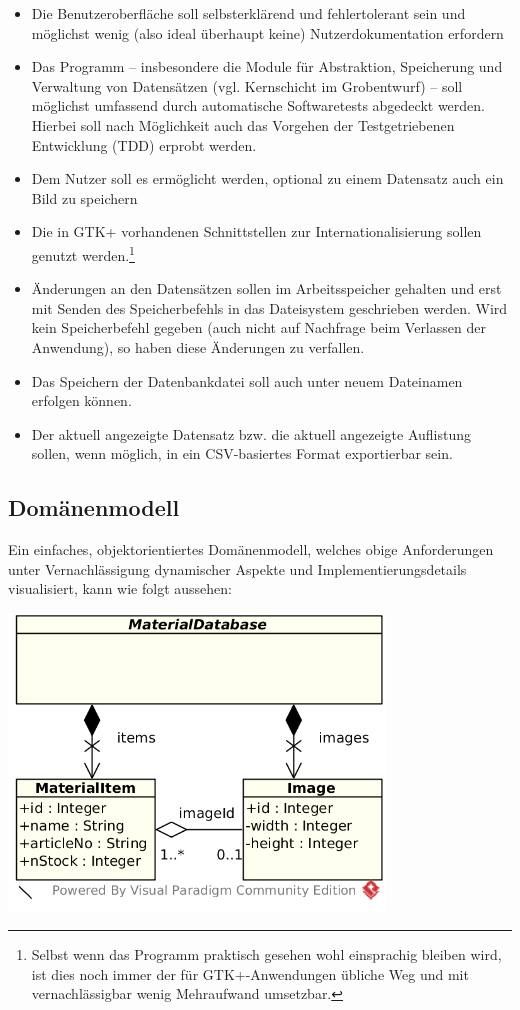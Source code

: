 \begin{itemize}
\item Die Benutzeroberfläche soll selbsterklärend und fehlertolerant sein und möglichst wenig (also ideal überhaupt keine)
Nutzerdokumentation erfordern
\item Das Programm -- insbesondere die Module für Abstraktion, Speicherung und Verwaltung von Datensätzen (vgl.
Kernschicht im Grobentwurf) -- soll möglichst umfassend durch automatische Softwaretests abgedeckt werden.
Hierbei soll nach Möglichkeit auch das Vorgehen der Testgetriebenen Entwicklung (TDD) erprobt werden.
\item Dem Nutzer soll es ermöglicht werden, optional zu einem Datensatz auch ein Bild zu speichern
\item Die in GTK+ vorhandenen Schnittstellen zur Internationalisierung sollen genutzt werden.\footnote{Selbst wenn das
Programm praktisch gesehen wohl einsprachig bleiben wird, ist dies noch immer der für GTK+-Anwendungen übliche Weg
und mit vernachlässigbar wenig Mehraufwand umsetzbar.}
\item Änderungen an den Datensätzen sollen im Arbeitsspeicher gehalten und erst mit Senden des Speicherbefehls in das
Dateisystem geschrieben werden. Wird kein Speicherbefehl gegeben (auch nicht auf Nachfrage beim Verlassen der Anwendung),
so haben diese Änderungen zu verfallen.
\item Das Speichern der Datenbankdatei soll auch unter neuem Dateinamen erfolgen können.
\item Der aktuell angezeigte Datensatz bzw. die aktuell angezeigte Auflistung sollen, wenn möglich, in ein CSV-basiertes
Format exportierbar sein.
\end{itemize}

\newpage
\subsection{Domänenmodell}
Ein einfaches, objektorientiertes Domänenmodell, welches obige Anforderungen unter Vernachlässigung dynamischer Aspekte
und Implementierungsdetails visualisiert, kann wie folgt aussehen:

\begin{center}
\noindent\includegraphics[width=100mm,keepaspectratio]{images/01-domaenenmodell.png}
\end{center}